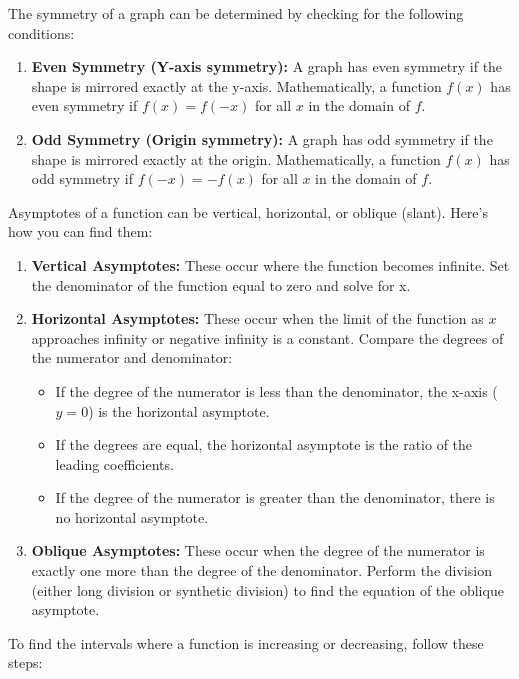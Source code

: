 \documentclass{article}
\begin{document}
The symmetry of a graph can be determined by checking for the following conditions:

\begin{enumerate}
    \item \textbf{Even Symmetry (Y-axis symmetry):} A graph has even symmetry if the shape is mirrored exactly at the y-axis. Mathematically, a function $f(x)$ has even symmetry if $f(x) = f(-x)$ for all $x$ in the domain of $f$.
    \item \textbf{Odd Symmetry (Origin symmetry):} A graph has odd symmetry if the shape is mirrored exactly at the origin. Mathematically, a function $f(x)$ has odd symmetry if $f(-x) = -f(x)$ for all $x$ in the domain of $f$.
\end{enumerate}

Asymptotes of a function can be vertical, horizontal, or oblique (slant). Here's how you can find them:

\begin{enumerate}
    \item \textbf{Vertical Asymptotes:} These occur where the function becomes infinite. Set the denominator of the function equal to zero and solve for x.
    \item \textbf{Horizontal Asymptotes:} These occur when the limit of the function as $x$ approaches infinity or negative infinity is a constant. Compare the degrees of the numerator and denominator:
    \begin{itemize}
        \item If the degree of the numerator is less than the denominator, the x-axis ($y = 0$) is the horizontal asymptote.
        \item If the degrees are equal, the horizontal asymptote is the ratio of the leading coefficients.
        \item If the degree of the numerator is greater than the denominator, there is no horizontal asymptote.
    \end{itemize}
    \item \textbf{Oblique Asymptotes:} These occur when the degree of the numerator is exactly one more than the degree of the denominator. Perform the division (either long division or synthetic division) to find the equation of the oblique asymptote.
\end{enumerate}

To find the intervals where a function is increasing or decreasing, follow these steps:
\end{document}
